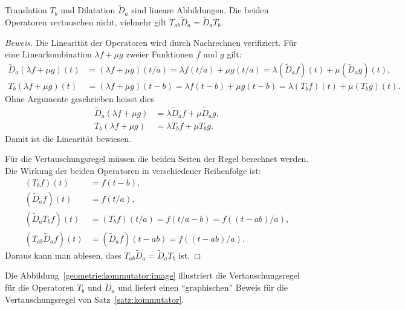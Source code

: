 \begin{satz}
\label{satz:kommutator}
Translation $T_b$ und Dilatation $\tilde{D}_a$ sind lineare Abbildungen.
Die beiden Operatoren vertauschen nicht, vielmehr gilt
$T_{ab}\tilde{D}_a = \tilde{D}_aT_b$.
\end{satz}
%

\begin{proof}[Beweis]
Die Linearität der Operatoren wird durch Nachrechnen verifiziert.
Für eine Linearkombination $\lambda f+\mu g$ zweier Funktionen $f$ und $g$ gilt:
\begin{align*}
\tilde{D}_a(\lambda f+\mu g)(t)
&=
(\lambda f+\mu g)(t/a)
=
\lambda f(t/a)+\mu g(t/a)
=
\lambda (\tilde{D}_af)(t)+\mu (\tilde{D}_ag)(t),
\\
T_b(\lambda f+ \mu g)(t)
&=
(\lambda f+\mu g)(t-b)
=
\lambda f(t-b)+\mu g(t-b)
=
\lambda (T_bf)(t)+\mu (T_bg)(t).
\end{align*}
Ohne Argumente geschrieben heisst dies
\begin{align*}
\tilde{D}_a(\lambda f+\mu g) &= \lambda \tilde{D}_af + \mu \tilde{D}_ag,
\\
T_b(\lambda f+\mu g) &= \lambda T_bf + \mu T_bg.
\end{align*}
Damit ist die Linearität bewiesen.

Für die Vertauschungsregel müssen die beiden Seiten der Regel
berechnet werden.
Die Wirkung der beiden Operatoren in verschiedener Reihenfolge
ist:
\begin{align*}
(T_bf)(t)
&=
f(t-b),
\\
(\tilde{D}_af)(t)
&=
f(t/a),
\\
(\tilde{D}_aT_bf)(t)
&=
(T_bf)(t/a)
=
f(t/a-b)
=
f((t-ab)/a),
\\
(T_{ab}\tilde{D}_a f)(t)
&=
(\tilde{D}_af)(t - ab)
=
f((t-ab)/a).
\end{align*}
Daraus kann man ablesen, dass $T_{ab}\tilde{D}_a=\tilde{D}_aT_b$ ist.
\end{proof}

Die Abbildung~\ref{geometrie:kommutator:image} illustriert die
Vertauschungsregel für die Operatoren $T_b$ und $\tilde{D}_a$ und liefert
einen ``graphischen'' Beweis für die Vertauschungsregel von
Satz~\ref{satz:kommutator}.

